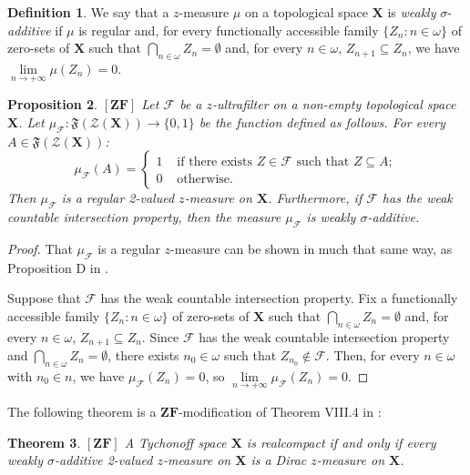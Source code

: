 \documentclass[12pt,twoside,leqno]{article}
\theoremstyle{plain}
\newtheorem{theorem}{Theorem}[section]
\newtheorem{proposition}[theorem]{Proposition}
\theoremstyle{definition}
\newtheorem{definition}[theorem]{Definition}
\theoremstyle{remark}
\begin{document}
\begin{definition}
	\label{s8:d6}
	We say that a $z$-measure $\mu$ on a topological space $\mathbf{X}$ is \emph{weakly} $\sigma$-\emph{additive} if $\mu$ is regular and, for every functionally accessible family $\{Z_n: n\in\omega\}$ of zero-sets of $\mathbf{X}$ such that $\bigcap_{n\in\omega}Z_n=\emptyset$ and, for every $n\in\omega$, $Z_{n+1}\subseteq Z_n$, we have $\lim\limits_{n\to+\infty}\mu(Z_n)=0$.
\end{definition}

\begin{proposition}
	\label{s8:p7}
	$[\mathbf{ZF}]$ Let $\mathcal{F}$ be a $z$-ultrafilter on a non-empty topological space $\mathbf{X}$. Let $\mu_{\mathcal{F}}:\mathfrak{F}(\mathcal{Z}(\mathbf{X}))\to\{0,1\}$ be the function defined as follows. For every $A\in\mathfrak{F}(\mathcal{Z}(\mathbf{X}))$:
	$$
	\mu_{\mathcal{F}}(A)=\begin{cases} 1 &\text{ if there exists } Z\in\mathcal{F} \text{ such that } Z\subseteq A;\\
		0 &\text{ otherwise}. \end{cases}
	$$
	Then $\mu_{\mathcal{F}}$ is a regular 2-valued $z$-measure on $\mathbf{X}$. Furthermore, if $\mathcal{F}$ has the weak countable intersection property, then the measure $\mu_{\mathcal{F}}$ is weakly $\sigma$-additive.
\end{proposition}
\begin{proof}
	That $\mu_{\mathcal{F}}$ is a regular $z$-measure can be shown in much that same way, as Proposition D in \cite[p. 485]{nag}. 
	
	Suppose that $\mathcal{F}$ has the weak countable intersection property. Fix a functionally accessible family $\{Z_n: n\in\omega\}$ of zero-sets of $\mathbf{X}$ such that $\bigcap_{n\in\omega}Z_n=\emptyset$ and, for every $n\in\omega$, $Z_{n+1}\subseteq Z_n$. Since $\mathcal{F}$ has the weak countable intersection property and $\bigcap_{n\in\omega}Z_n=\emptyset$, there exists $n_0\in\omega$ such that $Z_{n_0}\notin\mathcal{F}$. Then, for every $n\in\omega$ with $n_0\in n$, we have $\mu_{\mathcal{F}}(Z_n)=0$, so $\lim\limits_{n\to+\infty}\mu_{\mathcal{F}}(Z_n)=0$.
\end{proof}

The following theorem is a $\mathbf{ZF}$-modification of Theorem VIII.4 in \cite[p. 487]{nag}:

\begin{theorem}
	\label{s8:t8}
	$[\mathbf{ZF}]$ A Tychonoff space $\mathbf{X}$ is realcompact if and only if every weakly $\sigma$-additive 2-valued $z$-measure on $\mathbf{X}$ is a Dirac $z$-measure on $\mathbf{X}$.
\end{theorem} 
\end{document}
